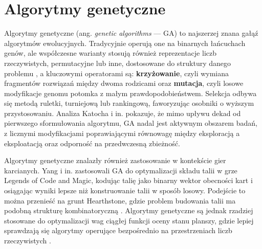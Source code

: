 \section{Algorytmy genetyczne}

Algorytmy genetyczne (ang. \textit{genetic algorithms} --- GA) to najszerzej znana gałąź algorytmów ewolucyjnych. Tradycyjnie operują one na binarnych łańcuchach genów, ale współczesne warianty stosują również reprezentacje liczb rzeczywistych, permutacyjne lub inne, dostosowane do struktury danego problemu \cite{Katoch2021}, a kluczowymi operatorami są: \textbf{krzyżowanie}, czyli wymiana fragmentów rozwiązań między dwoma rodzicami oraz \textbf{mutacja}, czyli losowe modyfikacje genomu potomka z małym prawdopodobieństwem. Selekcja odbywa się metodą ruletki, turniejową lub rankingową, faworyzując osobniki o wyższym przystosowaniu. Analiza Katocha i in. \cite{Katoch2021} pokazuje, że mimo upływu dekad od pierwszego sformułowania algorytmu, GA nadal jest aktywnym obszarem badań, z licznymi modyfikacjami poprawiającymi równowagę między eksploracją a eksploatacją oraz odporność na przedwczesną zbieżność.

Algorytmy genetyczne znalazły również zastosowanie w kontekście gier karcianych. Yang i in. \cite{yang2021} zastosowali GA do optymalizacji składu talii w grze Legends of Code and Magic, kodując talię jako binarny wektor obecności kart i osiągając wyniki lepsze niż konstruowanie talii w sposób losowy. Podejście to można przenieść na grunt Hearthstone, gdzie problem budowania talii ma podobną strukturę kombinatoryczną \cite{kowalski2023}. Algorytmy genetyczne są jednak rzadziej stosowane do optymalizacji wag ciągłej funkcji oceny stanu planszy, gdzie lepiej sprawdzają się algorytmy operujące bezpośrednio na przestrzeniach liczb rzeczywistych \cite{sanchez2020}.
